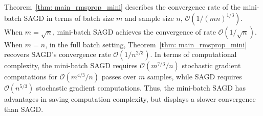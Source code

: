 \documentclass[11pt]{article}
\begin{document}
Theorem~\ref{thm: main_rmsprop_mini} 
describes the convergence rate of the mini-batch \textsc{SAGD} in terms of batch size $m$ and sample size $n$, \ie $\mathcal{O}(1/(mn)^{1/3})$. 
When $m = \sqrt{n}$, mini-batch \textsc{SAGD} achieves the convergence of rate $\mathcal{O}(1/\sqrt{n})$. When $m=n$, \ie in the full batch setting, Theorem~\ref{thm: main_rmsprop_mini} recovers \textsc{SAGD}'s convergence rate  $\mathcal{O}(1/n^{2/3})$. 
In terms of computational complexity, the mini-batch \textsc{SAGD} requires $\mathcal{O}(m^{7/3}/n)$ stochastic gradient computations for $\mathcal{O}(m^{4/3}/n)$ passes over $m$ samples, while \textsc{SAGD} requires $\mathcal{O}(n^{5/3})$ stochastic gradient computations. Thus, the mini-batch \textsc{SAGD} has advantages in saving computation complexity, but displays a slower convergence than \textsc{SAGD}.
\vspace{-0.05in}
\end{document}
